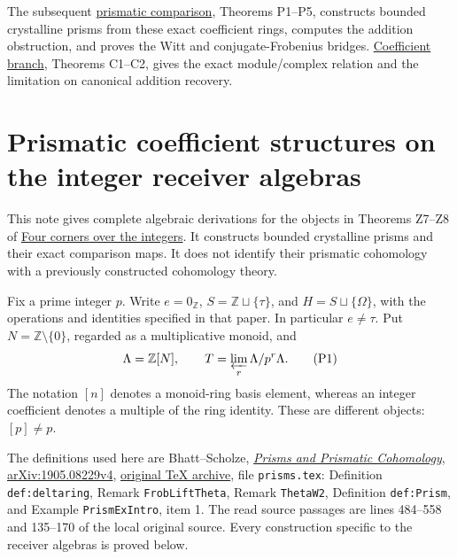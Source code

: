 \documentclass[
]{article}
\begin{document}
The subsequent
\href{https://github.com/KokunoYumeto/zeta-function-research-reader/blob/6af54ea3c8ef99127af327f3103e086c68d482c2/workbenches/splitzero-tandem/branches/identity-absorber-square/PRISMATIC_COMPARISON.md}{prismatic
comparison}, Theorems P1--P5, constructs bounded crystalline prisms from
these exact coefficient rings, computes the addition obstruction, and
proves the Witt and conjugate-Frobenius bridges.
\href{https://github.com/KokunoYumeto/zeta-function-research-reader/blob/6af54ea3c8ef99127af327f3103e086c68d482c2/workbenches/splitzero-tandem/branches/identity-absorber-square/COEFFICIENT_BRANCH.md}{Coefficient
branch}, Theorems C1--C2, gives the exact module/complex relation and
the limitation on canonical addition recovery.

\section{Prismatic coefficient structures on the integer receiver
algebras}\label{prismatic-coefficient-structures-on-the-integer-receiver-algebras}

This note gives complete algebraic derivations for the objects in
Theorems Z7--Z8 of
\href{https://github.com/KokunoYumeto/zeta-function-research-reader/blob/6af54ea3c8ef99127af327f3103e086c68d482c2/workbenches/splitzero-tandem/branches/identity-absorber-square/FOUR_CORNERS_OVER_Z.md}{Four
corners over the integers}. It constructs bounded crystalline prisms and
their exact comparison maps. It does not identify their prismatic
cohomology with a previously constructed cohomology theory.

Fix a prime integer \(p\). Write \(e=0_{\mathbb Z}\),
\(S=\mathbb Z\sqcup\{\tau\}\), and \(H=S\sqcup\{\Omega\}\), with the
operations and identities specified in that paper. In particular
\(e\ne\tau\). Put \(N=\mathbb Z\setminus\{0\}\), regarded as a
multiplicative monoid, and \[
\Lambda=\mathbb Z[N],\qquad T=\varprojlim_r\Lambda/p^r\Lambda.
\tag{P1}
\] The notation \([n]\) denotes a monoid-ring basis element, whereas an
integer coefficient denotes a multiple of the ring identity. These are
different objects: \([p]\ne p\).

The definitions used here are Bhatt--Scholze,
\href{https://arxiv.org/abs/1905.08229v4}{\emph{Prisms and Prismatic
Cohomology}, arXiv:1905.08229v4},
\href{https://arxiv.org/src/1905.08229v4}{original TeX archive}, file
\texttt{prisms.tex}: Definition \texttt{def:deltaring}, Remark
\texttt{FrobLiftTheta}, Remark \texttt{ThetaW2}, Definition
\texttt{def:Prism}, and Example \texttt{PrismExIntro}, item 1. The read
source passages are lines 484--558 and 135--170 of the local original
source. Every construction specific to the receiver algebras is proved
below.
\end{document}
